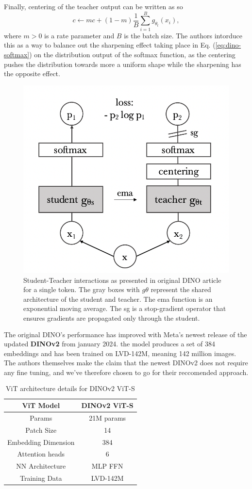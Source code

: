 Finally, centering of the teacher output can be written as so
\begin{equation}
c \gets mc + (1 - m) \frac{1}{B} \sum_{i=1}^B g_{\theta_t}(x_i),
\end{equation}
where $m > 0$ is a rate parameter and $B$ is the batch size. The authors intorduce this as a way to balance out the sharpening effect taking place in Eq. (\ref{eq:dino-softmax}) on the distribution output of the softmax function, as the centering pushes the distribution towards more a uniform shape while the sharpening has the opposite effect.
%
%
%
\begin{figure}[H]
    \centering
    \includegraphics[width=0.7\linewidth]{examples/tests_eb/figs/dino.png}
    \caption{Student-Teacher interactions as presented in original DINO article \cite{dino1} for a single token. The gray boxes with $g\theta$ represent the shared architecture of the student and teacher. The ema function is an exponential moving average. The sg is a stop-gradient operator that ensures gradients are propagated only through the student.}
    \label{fig:dino}
\end{figure}
%
%


The original DINO's performance has improved with Meta's newest release of the updated \textbf{DINOv2} \cite{dino2} from january 2024. the model produces a set of 384 embeddings and has been trained on LVD-142M, meaning 142 million images. The authors themselves make the claim that the newest DINOv2 does not require any fine tuning, and we've therefore chosen to go for their reccomended approach. 

\begin{table}[H]
\centering
\caption{ViT architecture details for DINOv2 ViT-S}
\begin{tabular}{c|c}
\textbf{ViT Model} & DINOv2 ViT-S \\ \hline
Params & 21M params \\ 
Patch Size & 14 \\ 
Embedding Dimension & 384 \\
Attention heads & 6 \\ 
NN Architecture & MLP FFN \\
Training Data & LVD-142M \\ 
\end{tabular} \label{tab:vit-params}
\end{table}

